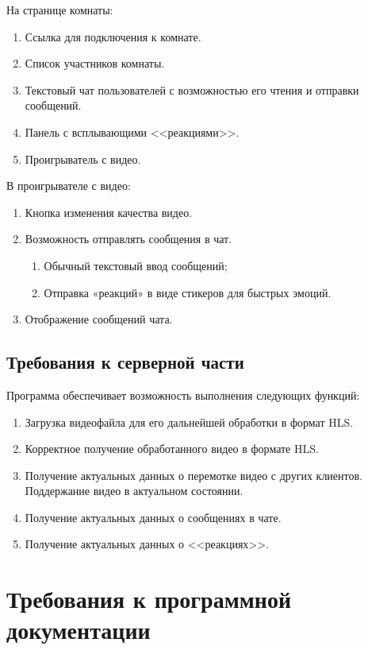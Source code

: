 \documentclass{../../includes/TechDocMultiAuthors}
\begin{document}
    На странице комнаты:
    \begin{enumerate}[noitemsep]
        \item Ссылка для подключения к комнате.
        \item Список участников комнаты.
        \item Текстовый чат пользователей с возможностью его чтения и отправки сообщений.
        \item Панель с всплывающими <<реакциями>>.
        \item Проигрыватель с видео.
    \end{enumerate}

    В проигрывателе с видео:
    \begin{enumerate}[noitemsep]
        \item Кнопка изменения качества видео.
        \item Возможность отправлять сообщения в чат.
        \begin{enumerate}
            \item Обычный текстовый ввод сообщений;
            \item Отправка «реакций» в виде стикеров для быстрых эмоций.
        \end{enumerate}
        \item Отображение сообщений чата.
    \end{enumerate}

    \subsection{Требования к серверной части}

    Программа обеспечивает возможность выполнения следующих функций:
    \begin{enumerate}
        \item Загрузка видеофайла для его дальнейшей обработки в формат HLS.
        \item Корректное получение обработанного видео в формате HLS.
        \item Получение актуальных данных о перемотке видео с других клиентов.
        Поддержание видео в актуальном состоянии.
        \item Получение актуальных данных о сообщениях в чате.
        \item Получение актуальных данных о <<реакциях>>.
    \end{enumerate}

    \section{Требования к программной документации}
\end{document}
